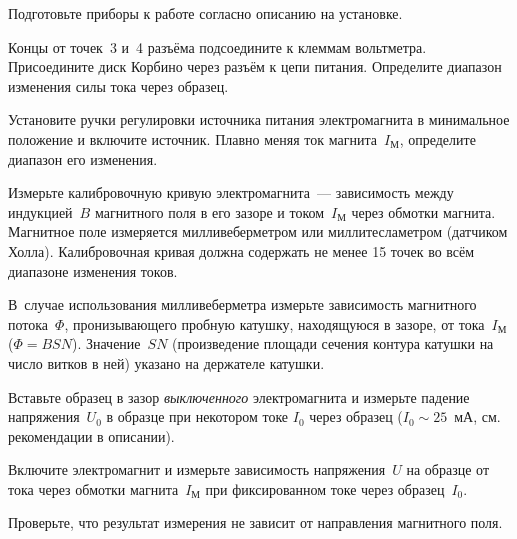 \begin{lab:task}


\item Подготовьте приборы к работе согласно описанию на установке.

\item Концы от точек~3 и~4 разъёма подсоедините к клеммам вольтметра.
Присоедините диск Корбино через разъём к цепи питания. Определите
диапазон изменения силы тока через образец.

\item Установите ручки регулировки источника питания электромагнита 
в минимальное положение и включите источник. 
Плавно меняя ток магнита~$I_{М}$, определите диапазон его изменения.

\item Измерьте калибровочную кривую электромагнита~---
зависимость между индукцией~$B$ магнитного поля в его зазоре и 
током~$I_{М}$ через обмотки магнита.
Магнитное поле измеряется милливеберметром или миллитесламетром
(датчиком Холла). Калибровочная кривая должна содержать не менее
15 точек во всём диапазоне изменения токов.

В~случае использования милливеберметра измерьте зависимость 
магнитного потока~$\Phi$, пронизывающего пробную катушку, 
находящуюся в зазоре, от тока~$I_{М}$ ($\Phi=BSN$). 
Значение~$SN$ (произведение площади сечения контура катушки на
число витков в ней) указано на держателе катушки.

\item \label{p1} Вставьте образец в зазор \emph{выключенного} электромагнита 
и измерьте падение напряжения~$U_0$ в образце при некотором токе $I_0$
через образец ($I_0\sim 25$~мА, см. рекомендации в описании). 

\item \label{p2} Включите электромагнит и измерьте зависимость напряжения~$U$ 
на образце от тока через обмотки магнита~$I_{М}$ при фиксированном токе
через образец~$I_0$.

\item Проверьте, что результат измерения не зависит от направления магнитного
поля.



\end{lab:task}

